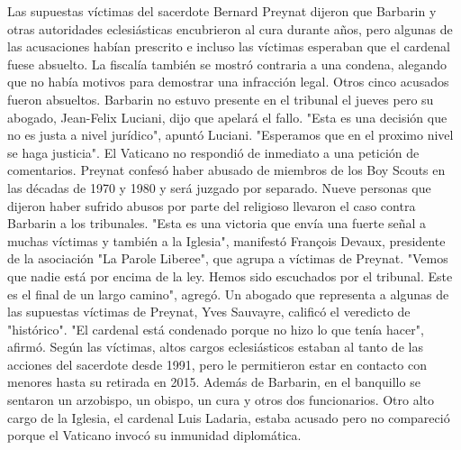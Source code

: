 \documentclass{article}%
\begin{document}
\newline%
%
Las supuestas víctimas del sacerdote Bernard Preynat dijeron que Barbarin y otras autoridades eclesiásticas encubrieron al cura durante años, pero algunas de las acusaciones habían prescrito e incluso las víctimas esperaban que el cardenal fuese absuelto. La fiscalía también se mostró contraria a una condena, alegando que no había motivos para demostrar una infracción legal.%
\newline%
%
Otros cinco acusados fueron absueltos.%
\newline%
%
Barbarin no estuvo presente en el tribunal el jueves pero su abogado, Jean{-}Felix Luciani, dijo que apelará el fallo.%
\newline%
%
"Esta es una decisión que no es justa a nivel jurídico", apuntó Luciani. "Esperamos que en el proximo nivel se haga justicia".%
\newline%
%
El Vaticano no respondió de inmediato a una petición de comentarios.%
\newline%
%
Preynat confesó haber abusado de miembros de los Boy Scouts en las décadas de 1970 y 1980 y será juzgado por separado.%
\newline%
%
Nueve personas que dijeron haber sufrido abusos por parte del religioso llevaron el caso contra Barbarin a los tribunales.%
\newline%
%
"Esta es una victoria que envía una fuerte señal a muchas víctimas y también a la Iglesia", manifestó François Devaux, presidente de la asociación "La Parole Liberee", que agrupa a víctimas de Preynat.%
\newline%
%
"Vemos que nadie está por encima de la ley. Hemos sido escuchados por el tribunal. Este es el final de un largo camino", agregó.%
\newline%
%
Un abogado que representa a algunas de las supuestas víctimas de Preynat, Yves Sauvayre, calificó el veredicto de "histórico".%
\newline%
%
"El cardenal está condenado porque no hizo lo que tenía hacer", afirmó.%
\newline%
%
Según las víctimas, altos cargos eclesiásticos estaban al tanto de las acciones del sacerdote desde 1991, pero le permitieron estar en contacto con menores hasta su retirada en 2015.%
\newline%
%
Además de Barbarin, en el banquillo se sentaron un arzobispo, un obispo, un cura y otros dos funcionarios. Otro alto cargo de la Iglesia, el cardenal Luis Ladaria, estaba acusado pero no compareció porque el Vaticano invocó su inmunidad diplomática.%
\newline%
%
\end{document}
